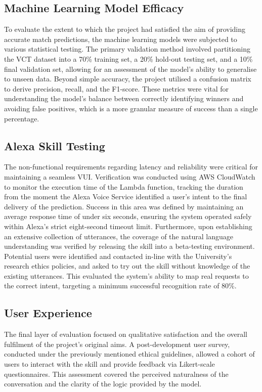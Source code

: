 \subsection{Machine Learning Model Efficacy}
To evaluate the extent to which the project had satisfied the aim of providing accurate match predictions, the machine learning models were subjected to various statistical testing. The primary validation method involved partitioning the VCT dataset into a 70\% training set, a 20\% hold-out testing set, and a 10\% final validation set, allowing for an assessment of the model's ability to generalise to unseen data. Beyond simple accuracy, the project utilised a confusion matrix to derive precision, recall, and the F1-score. These metrics were vital for understanding the model's balance between correctly identifying winners and avoiding false positives, which is a more granular measure of success than a single percentage.

\subsection{Alexa Skill Testing}
The non-functional requirements regarding latency and reliability were critical for maintaining a seamless VUI. Verification was conducted using AWS CloudWatch to monitor the execution time of the Lambda function, tracking the duration from the moment the Alexa Voice Service identified a user's intent to the final delivery of the prediction. Success in this area was defined by maintaining an average response time of under six seconds, ensuring the system operated safely within Alexa's strict eight-second timeout limit. Furthermore, upon establishing an extensive collection of utterances, the coverage of the natural language understanding was verified by releasing the skill into a beta-testing environment. Potential users were identified and contacted in-line with the University's research ethics policies, and asked to try out the skill without knowledge of the existing utterances. This evaluated the system's ability to map real requests to the correct intent, targeting a minimum successful recognition rate of 80\%.

\subsection{User Experience}
The final layer of evaluation focused on qualitative satisfaction and the overall fulfilment of the project's original aims. A post-development user survey, conducted under the previously mentioned ethical guidelines, allowed a cohort of users to interact with the skill and provide feedback via Likert-scale questionnaires. This assessment covered the perceived naturalness of the conversation and the clarity of the logic provided by the model.

